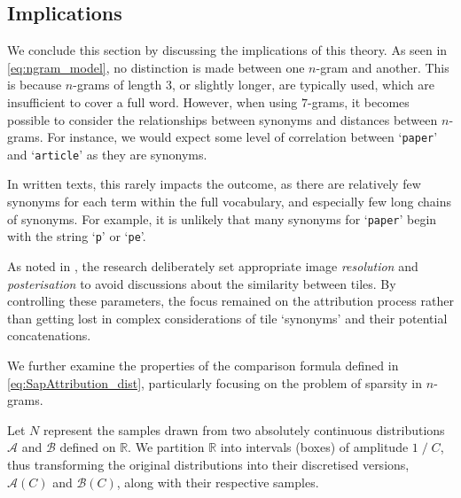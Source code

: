 \subsection{Implications}
We conclude this section by discussing the implications of this theory. As seen in \cref{eq:ngram_model}, no distinction is made between one $n$-gram and another. This is because $n$-grams of length 3, or slightly longer, are typically used, which are insufficient to cover a full word. However, when using $7$-grams, it becomes possible to consider the relationships between synonyms and distances between $n$-grams. For instance, we would expect some level of correlation between ‘\texttt{paper}’ and ‘\texttt{article}’ as they are synonyms.

\noindent In written texts, this rarely impacts the outcome, as there are relatively few synonyms for each term within the full vocabulary, and especially few long chains of synonyms. For example, it is unlikely that many synonyms for ‘\texttt{paper}’ begin with the string ‘\texttt{p}’ or ‘\texttt{pe}’.

\noindent As noted in \cite{thesis}, the research deliberately set appropriate image \textit{resolution} and \textit{posterisation} to avoid discussions about the similarity between tiles. By controlling these parameters, the focus remained on the attribution process rather than getting lost in complex considerations of tile ‘synonyms’ and their potential concatenations.

\bigskip
\noindent We further examine the properties of the comparison formula defined in  \cref{eq:SapAttribution_dist}, particularly focusing on the problem of sparsity in $n$-grams.

\noindent Let $N$ represent the samples drawn from two absolutely continuous distributions $\mathcal{A}$ and $\mathcal{B}$ defined on $\mathbb{R}$. We partition $\mathbb{R}$ into intervals (boxes) of amplitude $1 \; / \; C$, thus transforming the original distributions into their discretised versions, $\mathcal{A}(C)$ and $\mathcal{B}(C)$, along with their respective samples.

